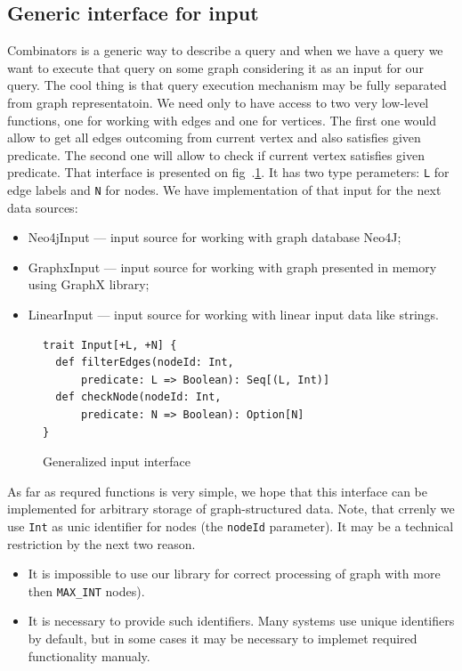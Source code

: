 \subsection{Generic interface for input}
Combinators is a generic way to describe a query and when we have a query we want to execute that query on some graph considering it as an input for our query.
The cool thing is that query execution mechanism may be fully separated from graph representatoin.
We need only to have access to two very low-level functions, one for working with edges and one for vertices. 
The first one would allow to get all edges outcoming from current vertex and also satisfies given predicate. 
The second one will allow to check if current vertex satisfies given predicate.
That interface is presented on fig~.\ref{fig:input}.
It has two type perameters: \lstinline{L} for edge labels and \lstinline{N} for nodes.
We have implementation of that input for the next data sources: 

\begin{itemize}
    \item Neo4jInput --- input source for working with graph database Neo4J;
    \item GraphxInput --- input source for working with graph presented in memory using GraphX library;
    \item LinearInput --- input source for working with linear input data like strings.
\end{itemize}

\begin{figure}[h]
\begin{lstlisting}
trait Input[+L, +N] {
  def filterEdges(nodeId: Int, 
      predicate: L => Boolean): Seq[(L, Int)]
  def checkNode(nodeId: Int, 
      predicate: N => Boolean): Option[N]
}

\end{lstlisting}
\caption{Generalized input interface}
\label{fig:input}
\end{figure}

As far as requred functions is very simple, we hope that this interface can be implemented for arbitrary storage of graph-structured data.
Note, that crrenly we use \lstinline{Int} as unic identifier for nodes (the \lstinline{nodeId} parameter).
It may be a technical restriction by the next two reason.
\begin{itemize}
\item It is impossible to use our library for correct processing of graph with more then \lstinline{MAX_INT} nodes). 
\item It is necessary to provide such identifiers. Many systems use unique identifiers by default, but in some cases it may be necessary to implemet required functionality manualy.
\end{itemize}



